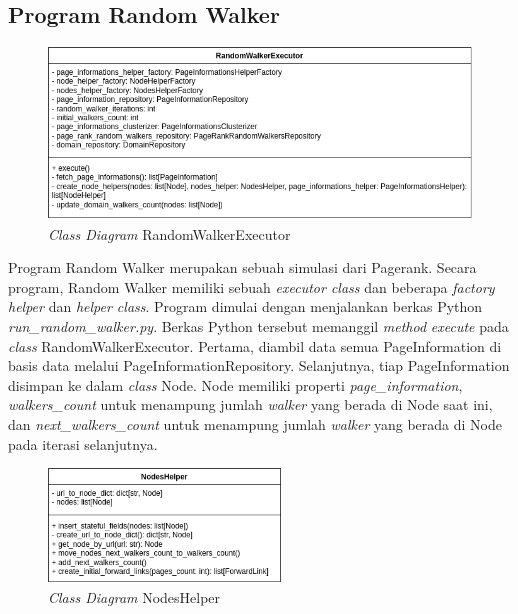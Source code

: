 \subsection{Program Random Walker}

\begin{figure}[H]
	\centering
	\includegraphics[keepaspectratio, width={\textwidth}]{gambar/random_walker_executor_class_diagram}
	\caption{\textit{Class Diagram} RandomWalkerExecutor}
\end{figure}

Program Random Walker merupakan sebuah simulasi dari Pagerank. Secara program, Random Walker memiliki sebuah \textit{executor class} dan beberapa \textit{factory helper} dan \textit{helper class}. Program dimulai dengan menjalankan berkas Python \textit{run\_random\_walker.py}. Berkas Python tersebut memanggil \textit{method} \textit{execute} pada \textit{class} RandomWalkerExecutor. Pertama, diambil data semua PageInformation di basis data melalui PageInformationRepository. Selanjutnya, tiap PageInformation disimpan ke dalam \textit{class} Node. Node memiliki properti \textit{page\_information}, \textit{walkers\_count} untuk menampung jumlah \textit{walker} yang berada di Node saat ini, dan \textit{next\_walkers\_count} untuk menampung jumlah \textit{walker} yang berada di Node pada iterasi selanjutnya.

\begin{figure}[H]
	\centering
	\includegraphics[keepaspectratio, width={0.55\textwidth}]{gambar/nodes_helper_class_diagram}
	\caption{\textit{Class Diagram} NodesHelper}
\end{figure}

